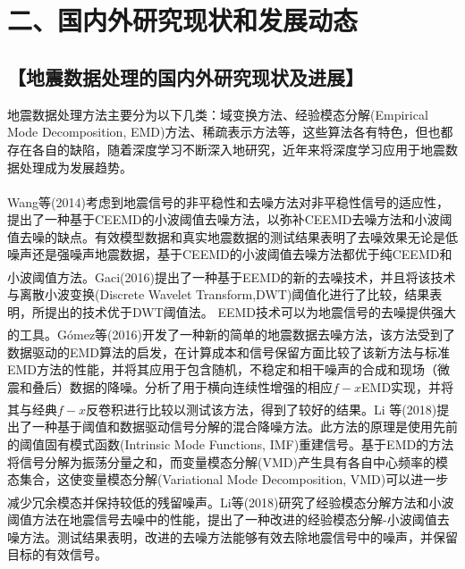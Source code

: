 \documentclass[11pt]{article}
\newcommand{\hei}{\CJKfamily{hei}}
\newcommand{\kai}{\CJKfamily{kai}}
\newcommand{\upcite}[1]{\textsuperscript{\textsuperscript{\cite{#1}}}}
\begin{document}
\section*{\hei\fontsize{11pt}{10pt} \selectfont \\ 二、国内外研究现状和发展动态}
\subsection*{\kai\fontsize{11pt}{10pt} \selectfont【地震数据处理的国内外研究现状及进展】}
地震数据处理方法主要分为以下几类：域变换方法、经验模态分解(Empirical Mode Decomposition, EMD)方法、稀疏表示方法等，这些算法各有特色，但也都存在各自的缺陷，随着深度学习不断深入地研究，近年来将深度学习应用于地震数据处理成为发展趋势。
\par
Wang等\upcite{WangJ2014}(2014)考虑到地震信号的非平稳性和去噪方法对非平稳性信号的适应性，提出了一种基于CEEMD的小波阈值去噪方法，以弥补CEEMD去噪方法和小波阈值去噪的缺点。有效模型数据和真实地震数据的测试结果表明了去噪效果无论是低噪声还是强噪声地震数据，基于CEEMD的小波阈值去噪方法都优于纯CEEMD和小波阈值方法。Gaci\upcite{Gaci2016}(2016)提出了一种基于EEMD的新的去噪技术，并且将该技术与离散小波变换(Discrete Wavelet Transform,DWT)阈值化进行了比较，结果表明，所提出的技术优于DWT阈值法。 EEMD技术可以为地震信号的去噪提供强大的工具。G$ó$mez等\upcite{Gómez2016}(2016)开发了一种新的简单的地震数据去噪方法，该方法受到了数据驱动的EMD算法的启发，在计算成本和信号保留方面比较了该新方法与标准EMD方法的性能，并将其应用于包含随机，不稳定和相干噪声的合成和现场（微震和叠后）数据的降噪。分析了用于横向连续性增强的相应$f-x$EMD实现，并将其与经典$f-x$反卷积进行比较以测试该方法，得到了较好的结果。Li 等\upcite{LiF2018}(2018)提出了一种基于阈值和数据驱动信号分解的混合降噪方法。此方法的原理是使用先前的阈值固有模式函数(Intrinsic Mode Functions, IMF)重建信号。基于EMD的方法将信号分解为振荡分量之和，而变量模态分解(VMD)产生具有各自中心频率的模态集合，这使变量模态分解(Variational Mode Decomposition, VMD)可以进一步减少冗余模态并保持较低的残留噪声。Li等\upcite{LiF2018}(2018)研究了经验模态分解方法和小波阈值方法在地震信号去噪中的性能，提出了一种改进的经验模态分解-小波阈值去噪方法。测试结果表明，改进的去噪方法能够有效去除地震信号中的噪声，并保留目标的有效信号。
\par
\end{document}
